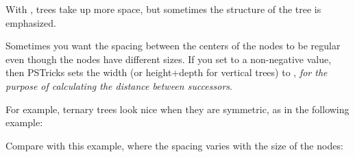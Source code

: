 \documentclass[11pt,english,BCOR10mm,DIV12,bibliography=totoc,parskip=false,smallheadings
    headexclude,footexclude,oneside]{pst-doc}
\begin{document}
With , trees take up more space, but sometimes the structure
of the tree is emphasized.




Sometimes you want the spacing between the centers of the nodes to be regular
even though the nodes have different sizes. If you set 
to a non-negative value, then PSTricks sets the width (or height+depth for
vertical trees) to , \emph{for the purpose of calculating the
distance between successors}.


For example, ternary trees look nice when they are symmetric, as in the
following example:

\begin{LTXexample}[pos=l,width=0.4\linewidth]
\end{LTXexample}

Compare with this example, where the spacing varies with the size of the
nodes:

\begin{LTXexample}[pos=l,width=0.4\linewidth]
\end{LTXexample}
\end{document}
